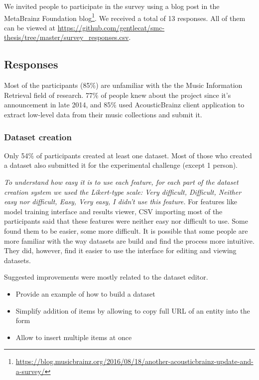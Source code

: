 We invited people to participate in the survey using a blog post in the MetaBrainz Foundation blog\footnote{\url{https://blog.musicbrainz.org/2016/08/18/another-acousticbrainz-update-and-a-survey/}}. We received a total of 13 responses. All of them can be viewed at \url{https://github.com/gentlecat/smc-thesis/tree/master/survey_responses.csv}.

\subsection{Responses}

Most of the participants (85\%) are unfamiliar with the the Music Information Retrieval field of research. 77\% of people knew about the project since it's announcement in late 2014, and 85\% used AcousticBrainz client application to extract low-level data from their music collections and submit it.

\subsubsection{Dataset creation}

Only 54\% of participants created at least one dataset. Most of those who created a dataset also submitted it for the experimental challenge (except 1 person).

\textit{To understand how easy it is to use each feature, for each part of the dataset creation system we used the Likert-type scale: Very difficult, Difficult, Neither easy nor difficult, Easy, Very easy, I didn't use this feature.} For features like model training interface and results viewer, CSV importing most of the participants said that these features were neither easy nor difficult to use. Some found them to be easier, some more difficult. It is possible that some people are more familiar with the way datasets are build and find the process more intuitive. They did, however, find it easier to use the interface for editing and viewing datasets.

Suggested improvements were mostly related to the dataset editor. 
\begin{itemize}
    \item Provide an example of how to build a dataset
    \item Simplify addition of items by allowing to copy full URL of an entity into the form
    \item Allow to insert multiple items at once
\end{itemize}


